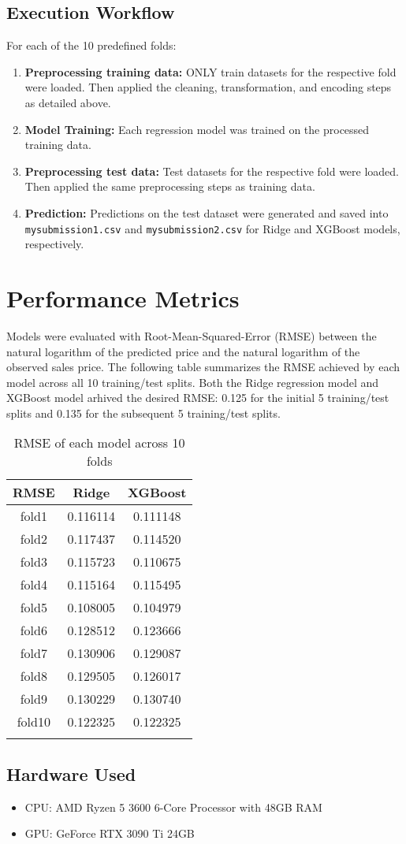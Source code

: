 \documentclass[11pt,a4paper]{article}
\begin{document}
\subsection{Execution Workflow}
For each of the 10 predefined folds:
\begin{enumerate}
  \item \textbf{Preprocessing training data:} ONLY train datasets for the respective fold were loaded. Then applied the cleaning, transformation, and encoding steps as detailed above.
  \item \textbf{Model Training:} Each regression model was trained on the processed training data.
  \item \textbf{Preprocessing test data:} Test datasets for the respective fold were loaded. Then applied the same preprocessing steps as training data.
  \item \textbf{Prediction:} Predictions on the test dataset were generated and saved into \texttt{mysubmission1.csv} and \texttt{mysubmission2.csv} for Ridge and XGBoost models, respectively.
\end{enumerate}

\section{Performance Metrics}
Models were evaluated with Root-Mean-Squared-Error (RMSE) between the natural
logarithm of the predicted price and the natural logarithm of the observed
sales price. The following table summarizes the RMSE achieved by each model
across all 10 training/test splits. Both the Ridge regression model and XGBoost
model arhived the desired RMSE: 0.125 for the initial 5 training/test splits
and 0.135 for the subsequent 5 training/test splits.

\begin{table}[h]
  \centering
  \begin{tabular}{c c c}
    \Xhline{2\arrayrulewidth}
    RMSE   & Ridge    & XGBoost  \\
    \hline
    fold1  & 0.116114 & 0.111148 \\
    fold2  & 0.117437 & 0.114520 \\
    fold3  & 0.115723 & 0.110675 \\
    fold4  & 0.115164 & 0.115495 \\
    fold5  & 0.108005 & 0.104979 \\
    fold6  & 0.128512 & 0.123666 \\
    fold7  & 0.130906 & 0.129087 \\
    fold8  & 0.129505 & 0.126017 \\
    fold9  & 0.130229 & 0.130740 \\
    fold10 & 0.122325 & 0.122325 \\
    \Xhline{2\arrayrulewidth}
  \end{tabular}
  \caption{RMSE of each model across 10 folds}
\end{table}

\subsection{Hardware Used}
\begin{itemize}
  \item CPU: AMD Ryzen 5 3600 6-Core Processor with 48GB RAM
  \item GPU: GeForce RTX 3090 Ti 24GB
\end{itemize}
\end{document}
